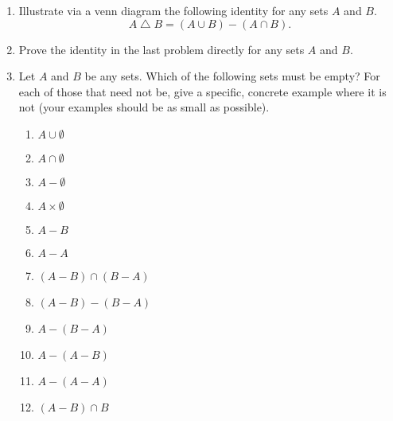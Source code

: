 \documentclass[11pt]{article}
\newcommand{\symdiff}{\mathop{\triangle}}
\theoremstyle{plain}
\theoremstyle{definition}
\begin{document}
\begin{enumerate}
\begin{figure}[H]
        \end{figure}
    \item
        Illustrate via a venn diagram the following identity for any sets $A$ and $B$.
        \[ A\symdiff B = (A\cup B) - (A\cap B). \]
    \item
        Prove the identity in the last problem directly for any sets $A$ and $B$.
    \item
        Let $A$ and $B$ be any sets.  Which of the following sets must
        be empty?  For each of those that need not be, give a specific,
        concrete example where it is not (your examples should be as small as possible).
        \begin{enumerate}
            \item
                $A\cup\emptyset$
            \item
                $A\cap\emptyset$
            \item
                $A-\emptyset$
            \item
                $A\times\emptyset$
            \item
                $A-B$
            \item
                $A-A$
            \item
                $(A-B)\cap(B-A)$
            \item
                $(A-B)-(B-A)$
            \item
                $A-(B-A)$
            \item
                $A-(A-B)$
            \item
                $A-(A-A)$
            \item
                $(A-B)\cap B$
        \end{enumerate}

\end{enumerate}
\end{document}
